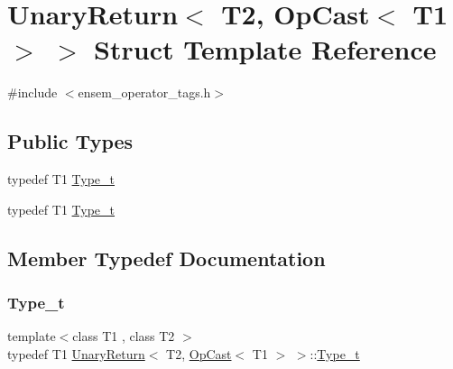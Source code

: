 \hypertarget{structUnaryReturn_3_01T2_00_01OpCast_3_01T1_01_4_01_4}{}\section{Unary\+Return$<$ T2, Op\+Cast$<$ T1 $>$ $>$ Struct Template Reference}
\label{structUnaryReturn_3_01T2_00_01OpCast_3_01T1_01_4_01_4}


{\ttfamily \#include $<$ensem\+\_\+operator\+\_\+tags.\+h$>$}

\subsection*{Public Types}
\begin{DoxyCompactItemize}
\item 
typedef T1 \mbox{\hyperlink{structUnaryReturn_3_01T2_00_01OpCast_3_01T1_01_4_01_4_a2783d52a76cad88255fd0cdbca603ebc}{Type\+\_\+t}}
\item 
typedef T1 \mbox{\hyperlink{structUnaryReturn_3_01T2_00_01OpCast_3_01T1_01_4_01_4_a2783d52a76cad88255fd0cdbca603ebc}{Type\+\_\+t}}
\end{DoxyCompactItemize}


\subsection{Member Typedef Documentation}
\mbox{\label{structUnaryReturn_3_01T2_00_01OpCast_3_01T1_01_4_01_4_a2783d52a76cad88255fd0cdbca603ebc}} 
\subsubsection{\texorpdfstring{Type\_t}{Type\_t}\hspace{0.1cm}{\footnotesize\ttfamily [1/2]}}
{\footnotesize\ttfamily template$<$class T1 , class T2 $>$ \\
typedef T1 \mbox{\hyperlink{structUnaryReturn}{Unary\+Return}}$<$ T2, \mbox{\hyperlink{structOpCast}{Op\+Cast}}$<$ T1 $>$ $>$\+::\mbox{\hyperlink{structUnaryReturn_3_01T2_00_01OpCast_3_01T1_01_4_01_4_a2783d52a76cad88255fd0cdbca603ebc}{Type\+\_\+t}}}

